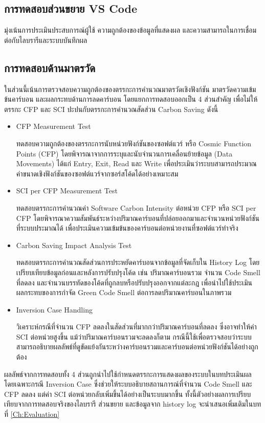 \subsection{การทดสอบส่วนขยาย VS Code}
มุ่งเน้นการประเมินประสบการณ์ผู้ใช้ ความถูกต้องของข้อมูลที่แสดงผล และความสามารถในการเชื่อมต่อกับไลบรารีและระบบบันทึกผล

\subsection{การทดสอบด้านมาตรวัด}
ในส่วนนี้เน้นการตรวจสอบความถูกต้องของตรรกะการคำนวณมาตรวัดเชิงฟังก์ชัน มาตรวัดความเข้มข้นคาร์บอน และผลกระทบด้านการลดคาร์บอน โดยแยกการทดสอบออกเป็น 4 ส่วนสำคัญ เพื่อไม่ให้ตรรกะ CFP และ SCI ปะปนกับตรรกะการคำนวณสัดส่วน Carbon Saving ดังนี้

\begin{itemize}
    \item {\boldfont CFP Measurement Test}

    ทดสอบความถูกต้องของตรรกะการนับหน่วยฟังก์ชันของซอฟต์แวร์ หรือ Cosmic Function Points (CFP) โดยพิจารณาจากการระบุและนับจำนวนการเคลื่อนย้ายข้อมูล ({\italicfont Data Movements}) ได้แก่ Entry, Exit, Read และ Write เพื่อประเมินว่าระบบสามารถประมาณค่าขนาดเชิงฟังก์ชันของซอฟต์แวร์จากซอร์สโค้ดได้อย่างเหมาะสม

    \item {\boldfont SCI per CFP Measurement Test}

    ทดสอบตรรกะการคำนวณค่า Software Carbon Intensity ต่อหน่วย CFP หรือ {\italicfont SCI per CFP} โดยพิจารณาความสัมพันธ์ระหว่างปริมาณคาร์บอนที่ปล่อยออกมาและจำนวนหน่วยฟังก์ชันที่ระบบประมาณได้ เพื่อประเมินความเข้มข้นของคาร์บอนต่อหน่วยงานที่ซอฟต์แวร์ทำจริง

    \item {\boldfont Carbon Saving Impact Analysis Test}

    ทดสอบตรรกะการคำนวณสัดส่วนการประหยัดคาร์บอนจากข้อมูลที่จัดเก็บใน History Log โดยเปรียบเทียบข้อมูลก่อนและหลังการปรับปรุงโค้ด เช่น ปริมาณคาร์บอนรวม จำนวน Code Smell ที่ลดลง และจำนวนบรรทัดของโค้ดที่ถูกลบหรือปรับปรุงออกจากแต่ละกฎ เพื่อนำไปใช้ประเมินผลกระทบของการกำจัด Green Code Smell ต่อการลดปริมาณคาร์บอนในภาพรวม

    \item {\boldfont Inversion Case Handling}

    วิเคราะห์กรณีที่จำนวน CFP ลดลงในสัดส่วนที่มากกว่าปริมาณคาร์บอนที่ลดลง ซึ่งอาจทำให้ค่า SCI ต่อหน่วยสูงขึ้น แม้ว่าปริมาณคาร์บอนรวมจะลดลงก็ตาม กรณีนี้ใช้เพื่อตรวจสอบว่าระบบสามารถอธิบายผลลัพธ์ที่ดูขัดแย้งกันระหว่างคาร์บอนรวมและคาร์บอนต่อหน่วยฟังก์ชันได้อย่างถูกต้อง
\end{itemize}

ผลลัพธ์จากการทดสอบทั้ง 4 ส่วนถูกนำไปใช้กำหนดตรรกะการแสดงผลของระบบในบทประเมินผล โดยเฉพาะกรณี {\italicfont Inversion Case} ซึ่งช่วยให้ระบบอธิบายสถานการณ์ที่จำนวน Code Smell และ CFP ลดลง แต่ค่า SCI ต่อหน่วยกลับเพิ่มขึ้นได้อย่างเป็นระบบมากขึ้น ทั้งนี้ตัวอย่างผลการเปรียบเทียบจากการทดสอบจริงของไลบรารี ส่วนขยาย และข้อมูลจาก history log จะนำเสนอเพิ่มเติมในบทที่ \ref{Ch:Evaluation}
